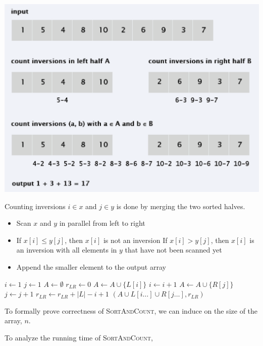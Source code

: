 \begin{center}
    \includegraphics[width=0.5\linewidth]{figures/counting-inversions.png}
\end{center}

Counting inversions $i \in x$ and $j \in y$ is done by merging the two sorted halves.

\begin{itemize}
    \item Scan $x$ and $y$ in parallel from left to right
    \item If $x[i] \le y[j]$, then $x[i]$ is not an inversion
    If $x[i] > y[j]$, then $x[i]$ is an inversion with all elements in $y$ that have not been scanned yet
    \item Append the smaller element to the output array
\end{itemize}

\begin{algorithm}
    \begin{algorithmic}[1]
            \State $i \gets 1$
            \State $j \gets 1$
            \State $A \gets \emptyset$
            \State $r_{LR} \gets 0$
                    \State $A \gets A \cup \{L[i]\}$
                    \State $i \gets i + 1$
                \Else
                    \State $A \gets A \cup \{R[j]\}$
                    \State $j \gets j + 1$
                    \State $r_{LR} \gets r_{LR} + |L| - i + 1$
                \EndIf
            \EndWhile
            \State \Return $(A \cup L[i \dots] \cup R[j \dots], r_{LR})$
        \EndFunction
    \end{algorithmic}
\end{algorithm}

To formally prove correctness of \textsc{SortAndCount}, we can induce on the size of the array, $n$. 

To analyze the running time of \textsc{SortAndCount}, 

